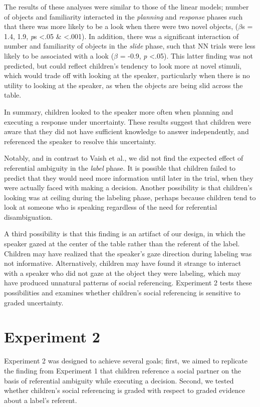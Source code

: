 \documentclass[a4paper,man,apacite,floatsintext]{apa6}
\begin{document}
The results of these analyses were similar to those of the linear
models; number of objects and familiarity interacted in the
\emph{planning} and \emph{response} phases such that there was more
likely to be a look when there were two novel objects, (\(\beta\)s =
1.4, 1.9, \emph{p}s \textless{}.05 \& \textless{}.001). In addition,
there was a significant interaction of number and familiarity of objects
in the \emph{slide} phase, such that NN trials were less likely to be
associated with a look (\(\beta\) = -0.9, \emph{p} \textless{}.05). This
latter finding was not predicted, but could reflect children's tendency
to look more at novel stimuli, which would trade off with looking at the
speaker, particularly when there is no utility to looking at the
speaker, as when the objects are being slid across the table.

In summary, children looked to the speaker more often when planning and
executing a response under uncertainty. These results suggest that
children were aware that they did not have sufficient knowledge to
answer independently, and referenced the speaker to resolve this
uncertainty.

Notably, and in contrast to Vaish et al., we did not find the expected
effect of referential ambiguity in the \emph{label} phase. It is
possible that children failed to predict that they would need more
information until later in the trial, when they were actually faced with
making a decision. Another possibility is that children's looking was at
ceiling during the labeling phase, perhaps because children tend to look
at someone who is speaking regardless of the need for referential
disambiguation.

A third possibility is that this finding is an artifact of our design,
in which the speaker gazed at the center of the table rather than the
referent of the label. Children may have realized that the speaker's
gaze direction during labeling was not informative. Alternatively,
children may have found it strange to interact with a speaker who did
not gaze at the object they were labeling, which may have produced
unnatural patterns of social referencing. Experiment 2 tests these
possibilities and examines whether children's social referencing is
sensitive to graded uncertainty.

\section{Experiment 2}\label{experiment-2}

Experiment 2 was designed to achieve several goals; first, we aimed to
replicate the finding from Experiment 1 that children reference a social
partner on the basis of referential ambiguity while executing a
decision. Second, we tested whether children's social referencing is
graded with respect to graded evidence about a label's referent.
\end{document}
